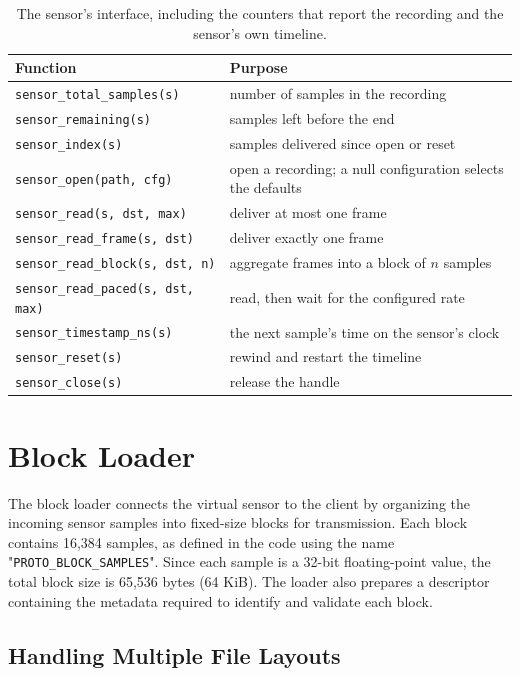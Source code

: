 \documentclass[12pt,a4paper,oneside]{report}
\begin{document}
\begin{table}[htbp]
\centering
\caption{The sensor's interface, including the counters that report the recording
and the sensor's own timeline.}
\label{tab:sensor-api}
\begin{tabular}{@{}lp{7.4cm}@{}}
\hline
Function & Purpose \\
\hline
\texttt{sensor\_total\_samples(s)} & number of samples in the recording \\
\texttt{sensor\_remaining(s)} & samples left before the end \\
\texttt{sensor\_index(s)} & samples delivered since open or reset \\
\texttt{sensor\_open(path, cfg)} & open a recording; a null configuration selects the defaults \\
\texttt{sensor\_read(s, dst, max)} & deliver at most one frame \\
\texttt{sensor\_read\_frame(s, dst)} & deliver exactly one frame \\
\texttt{sensor\_read\_block(s, dst, n)} & aggregate frames into a block of $n$ samples \\
\texttt{sensor\_read\_paced(s, dst, max)} & read, then wait for the configured rate \\
\texttt{sensor\_timestamp\_ns(s)} & the next sample's time on the sensor's clock \\
\texttt{sensor\_reset(s)} & rewind and restart the timeline \\
\texttt{sensor\_close(s)} & release the handle \\
\hline
\end{tabular}
\end{table}


\section{Block Loader}
\label{sec:block-loader}

The block loader connects the virtual sensor to the client by organizing the incoming sensor samples into fixed-size blocks for transmission. Each block contains 16,384 samples, as defined in the code using the name "\texttt{PROTO\_BLOCK\_SAMPLES}". Since each sample is a 32-bit floating-point value, the total block size is 65,536 bytes (64 KiB). The loader also prepares a descriptor containing the metadata required to identify and validate each block.

\subsection{Handling Multiple File Layouts}
\end{document}
